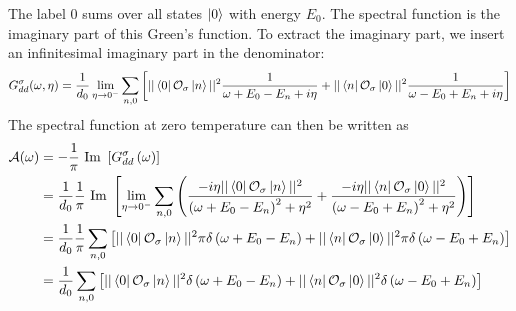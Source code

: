 \documentclass{report}
\numberwithin{equation}{section}
\begin{document}
\begin{appendices}
The label 0 sums over all states \(\ket{0}\) with energy \(E_0\). The spectral function is the imaginary part of this Green's function. To extract the imaginary part, we insert an infinitesimal imaginary part in the denominator:
\begin{equation}\begin{aligned}
	G_{d d}^\sigma(\omega, \eta) = \frac{1}{d_0}\lim_{\eta \to 0^-}\sum_{n,0}\left[||\bra{0}\mathcal{O}_{\sigma}\ket{n}||^2\frac{1}{\omega + E_0 - E_n + i\eta} + ||\bra{n}\mathcal{O}_{\sigma}\ket{0}||^2\frac{1}{\omega - E_0 + E_n + i\eta}\right]\\
\end{aligned}\end{equation}
The spectral function at zero temperature can then be written as
\begin{equation}\begin{aligned}
	\mathcal{A(\omega)} &= -\frac{1}{\pi}\text{ Im }\left[G_{dd}^\sigma\left( \omega \right) \right] \\
			    &= \frac{1}{d_0}\frac{1}{\pi}\text{ Im }\left[\lim_{\eta \to 0^-}\sum_{n,0}\left(\frac{-i\eta ||\bra{0}\mathcal{O}_{\sigma}\ket{n}||^2}{\left(\omega + E_0 - E_n\right)^2 + \eta^2} + \frac{-i\eta ||\bra{n}\mathcal{O}_{\sigma}\ket{0}||^2}{\left(\omega - E_0 + E_n\right)^2 + \eta^2}\right)\right]\\
			    &= \frac{1}{d_0}\frac{1}{\pi}\sum_{n,0}\left[||\bra{0}\mathcal{O}_{\sigma}\ket{n}||^2\pi\delta\left(\omega + E_0 - E_n\right) + ||\bra{n}\mathcal{O}_{\sigma}\ket{0}||^2\pi\delta\left(\omega - E_0 + E_n\right)\right]\\
			    &= \frac{1}{d_0}\sum_{n,0}\left[||\bra{0}\mathcal{O}_{\sigma}\ket{n}||^2\delta\left(\omega + E_0 - E_n\right) + ||\bra{n}\mathcal{O}_{\sigma}\ket{0}||^2\delta\left(\omega - E_0 + E_n\right)\right]\\
\end{aligned}\end{equation}


\end{appendices}
\end{document}
